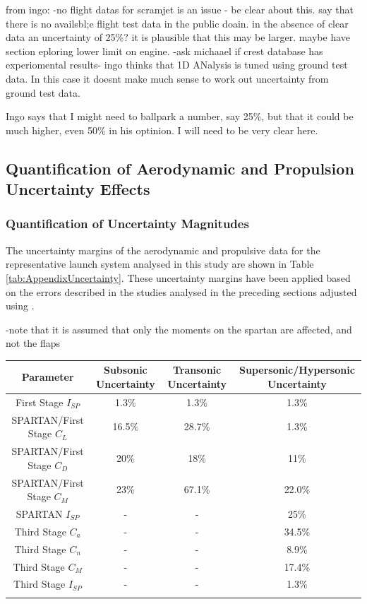 from ingo: -no flight datas for scramjet is an issue - be clear about this. say that there is no availsbl;e flight test data in the public doain. in the absence of clear data an uncertainty of 25\%? it is plausible that this may be larger. maybe have section eploring lower limit on engine.
-ask michaael if crest database has experiomental results- ingo thinks that 1D ANalysis is tuned using ground test data. In this case it doesnt make much sense to work out uncertainty from ground test data.

Ingo says that I might need to ballpark a number, say 25\%, but that it could be much higher, even 50\% in his optinion. I will need to be very clear here. 



\subsection{Quantification of Aerodynamic and Propulsion Uncertainty Effects}


\subsubsection{Quantification of Uncertainty Magnitudes}

The uncertainty margins of the aerodynamic and propulsive data for the representative launch system analysed in this study are shown in Table \ref{tab:AppendixUncertainty}. These uncertainty margins have been applied based on the errors described in the studies analysed in the preceding sections adjusted using . 

-note that it is assumed that only the moments on the spartan are affected, and not the flaps


\begin{tabular}{|c|c|c|c|}
	\hline  Parameter & Subsonic Uncertainty & Transonic Uncertainty  & Supersonic/Hypersonic Uncertainty \\ 
	\hline  First Stage $I_{SP}$ & 1.3\% & 1.3\% &  1.3\% \\ 
	\hline  SPARTAN/First Stage $C_L$ & 16.5\% & 28.7\% & 1.3\% \\  
	\hline  SPARTAN/First Stage $C_D$ & 20\% & 18\% & 11\% \\  
	\hline  SPARTAN/First Stage $C_M$  & 23\% & 67.1\% &  22.0\% \\ 
	\hline  SPARTAN $I_{SP}$ & - & - &  25\% \\ 
	\hline  Third Stage $C_a$ & - & - &  34.5\% \\ 
	\hline  Third Stage $C_n$ &  -& - & 8.9\% \\ 
	\hline  Third Stage $C_M$ & - & - & 17.4\%  \\ 
	\hline  Third Stage $I_{SP}$ & - & - & 1.3\%  \\ 
	\hline 
	\label{tab:AppendixUncertainty}
\end{tabular}


